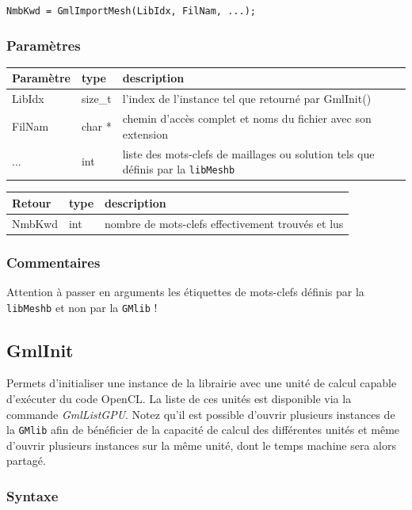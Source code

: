 \documentclass[a4paper,12pt]{article}
\begin{document}
{\tt NmbKwd = GmlImportMesh(LibIdx, FilNam, ...);}

\subsubsection*{Paramètres}

\begin{tabular}{|m{2cm}|m{1.5cm}|m{10.5cm}|}
\hline
Paramètre  & type    & description \\
\hline
LibIdx     & size\_t & l'index de l'instance tel que retourné par GmlInit() \\
\hline
FilNam     & char *  & chemin d'accès complet et noms du fichier avec son extension \\
\hline
...        & int     & liste des mots-clefs de maillages ou solution tels que définis par la {\tt libMeshb} \\
\hline
\end{tabular}

\medskip

\begin{tabular}{|m{2cm}|m{1.5cm}|m{10.5cm}|}
\hline
Retour     & type   & description \\
\hline
NmbKwd     & int    & nombre de mots-clefs effectivement trouvés et lus \\
\hline
\end{tabular}

\subsubsection*{Commentaires}
Attention à passer en arguments les étiquettes de mots-clefs définis par la {\tt libMeshb} et non par la {\tt GMlib} !


\subsection{GmlInit}

Permets d'initialiser une instance de la librairie avec une unité de calcul capable d'exécuter du code OpenCL.
La liste de ces unités est disponible via la commande \emph{GmlListGPU}.
Notez qu'il est possible d'ouvrir plusieurs instances de la {\tt GMlib} afin de bénéficier de la capacité de calcul des différentes unités et même d'ouvrir plusieurs instances sur la même unité, dont le temps machine sera alors partagé.

\subsubsection*{Syntaxe}
\end{document}
